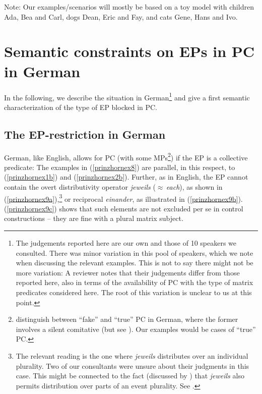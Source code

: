 \documentclass[output=paper]{langscibook}
\begin{document}
Note: Our examples/scenarios will mostly be based on a toy model with children Ada, Bea and Carl, dogs Dean, Eric and Fay, and cats Gene, Hans and Ivo. 



\section{Semantic constraints on EPs in PC in German}\label{prinzhornsec:2}

In the following, we describe the situation in German\footnote{The judgements reported here are our own and those of 10 speakers we consulted. There was minor variation in this pool of speakers, which we note when discussing the relevant examples. This is not to say there might not be more variation: A reviewer notes that their judgements differ from those reported here, also in terms of the availability of PC with the type of matrix predicates considered here. The root of this variation is unclear to us at this point.} and give a first semantic characterization of the type of EP blocked in PC.

\subsection{The EP-restriction in German}\label{prinzhornsec:2.1}

German, like English, allows for PC (with some MPs\footnote{\citet{Pitteroff:2017} distinguish between “fake” and “true” PC in German, where the former involves a silent comitative (but see \citealt{Landau:2016}). Our examples would be cases of “true” PC.}) if the EP is a collective predicate: The examples in (\ref{prinzhornex8}) are parallel, in this respect, to (\ref{prinzhornex1b}) and  (\ref{prinzhornex2b}). Further, as in English, the EP cannot contain the overt distributivity operator \textit{jeweils} ($\approx$\,\textit{each}), as shown in (\ref{prinzhornex9a}),\footnote{The relevant reading is the one where \textit{jeweils} distributes over an individual plurality. Two of our consultants were unsure about their judgments in this case. This might be connected to  the fact (discussed by \citealt{Zimmermann:2002}) that \textit{jeweils} also permits distribution over parts of an event plurality.  See .} or reciprocal \textit{einander}, as illustrated in (\ref{prinzhornex9b}). (\ref{prinzhornex9c}) shows that such elements are not excluded per se in control constructions -- they are fine with a plural matrix subject.
\end{document}
